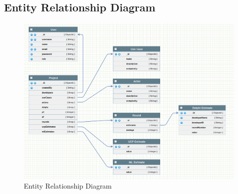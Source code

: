 \subsection{Entity Relationship Diagram}
\begin{figure}[H]
    \centering
    \includegraphics[scale=0.4]{./diagrams/ERD.png}
    \caption{Entity Relationship Diagram}
    \label{fig:er-diag}

\end{figure}












% 

